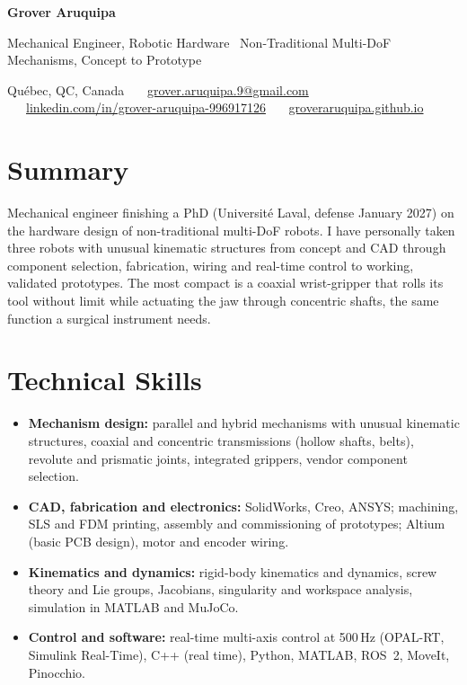 \documentclass[10pt,letterpaper]{article}
\begin{document}
{\LARGE\bfseries Grover Aruquipa}\par\vspace{2pt}
{\large Mechanical Engineer, Robotic Hardware \textbar\ Non-Traditional Multi-DoF Mechanisms, Concept to Prototype}\par\vspace{3pt}
{\small Qu\'ebec, QC, Canada \ \textbullet\ \
\href{mailto:grover.aruquipa.9@gmail.com}{grover.aruquipa.9@gmail.com} \ \textbullet\ \
\href{https://www.linkedin.com/in/grover-aruquipa-996917126}{linkedin.com/in/grover-aruquipa-996917126} \ \textbullet\ \
\href{https://groveraruquipa.github.io}{groveraruquipa.github.io}}\par

\section{Summary}
Mechanical engineer finishing a PhD (Universit\'e Laval, defense January 2027) on the hardware design of non-traditional
multi-DoF robots. I have personally taken three robots with unusual kinematic structures from concept and CAD through
component selection, fabrication, wiring and real-time control to working, validated prototypes. The most compact is a
coaxial wrist-gripper that rolls its tool without limit while actuating the jaw through concentric shafts, the same
function a surgical instrument needs.

\section{Technical Skills}
\begin{itemize}
\item \textbf{Mechanism design:} parallel and hybrid mechanisms with unusual kinematic structures, coaxial and concentric
transmissions (hollow shafts, belts), revolute and prismatic joints, integrated grippers, vendor component selection.
\item \textbf{CAD, fabrication and electronics:} SolidWorks, Creo, ANSYS; machining, SLS and FDM printing, assembly and
commissioning of prototypes; Altium (basic PCB design), motor and encoder wiring.
\item \textbf{Kinematics and dynamics:} rigid-body kinematics and dynamics, screw theory and Lie groups, Jacobians,
singularity and workspace analysis, simulation in MATLAB and MuJoCo.
\item \textbf{Control and software:} real-time multi-axis control at 500\,Hz (OPAL-RT, Simulink Real-Time), C++ (real
time), Python, MATLAB, ROS~2, MoveIt, Pinocchio.
\end{itemize}
\end{document}

